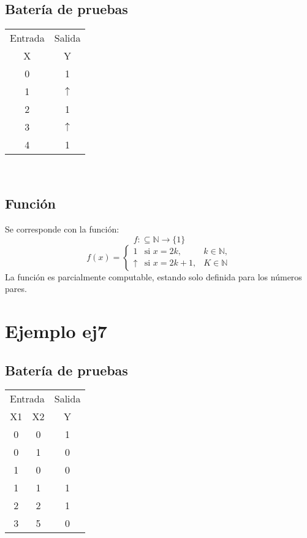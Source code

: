 \documentclass[a4paper]{article}
\begin{document}
  			\subsection{Batería de pruebas}
  			\begin{center}
  				\begin{tabular}{|c|c|} \hline
  					\multicolumn{1}{|l|}{Entrada}&\multicolumn{1}{l|}{Salida}\\
  				X & Y \\
  					\hline
  				0 & 1 \\
  				1 & $\uparrow$ \\
  				2 & 1 \\
  				3 & $\uparrow$ \\
  				4 & 1 \\
  					\hline
  				\end{tabular} \\
  			\end{center}
  			\subsection{Función}
  				Se corresponde con la función:
  				$$f:\subseteq \mathbb{N} \longrightarrow \{1\}$$
  				\begin{equation*}
  					f(x) = \left\{
  					\begin{array}{rcl}
  						1 & \text{si } x=2k, & k \in \mathbb{N}, \\
  						\uparrow & \text{si } x=2k+1, & K \in \mathbb{N}
  					\end{array} \right.
  				\end{equation*}
  				La función es parcialmente computable, estando solo definida para los números pares.

  		\section{Ejemplo ej7}
  			\subsection{Batería de pruebas}
  			\begin{center}
  				\begin{tabular}{|c|c|c|} \hline
  					\multicolumn{2}{|l|}{Entrada}&\multicolumn{1}{l|}{Salida}\\
  				X1 & X2 & Y \\
  					\hline
  				0 & 0 & 1 \\
  				0 & 1 & 0 \\
  				1 & 0 & 0 \\
  				1 & 1 & 1 \\
  				2 & 2 & 1 \\
  				3 & 5 & 0 \\
  					\hline
  				\end{tabular}\\
  			\end{center}
\end{document}
